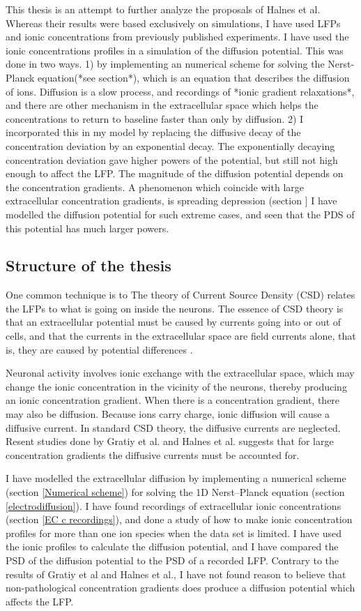 \documentclass{article}
\begin{document}
This thesis is an attempt to further analyze the proposals of Halnes et al. Whereas their results were based exclusively on simulations, I have used LFPs and ionic concentrations from previously published experiments. I have used the ionic concentrations profiles in a simulation of the diffusion potential. This was done in two ways. 1) by implementing an numerical scheme for solving the Nerst-Planck equation(*see section*), which is an equation that describes the diffusion of ions. Diffusion is a slow process, and recordings of *ionic gradient relaxations*, and there are other mechanism in the extracellular space which helps the concentrations to return to baseline faster than only by diffusion. 2)  I incorporated this in my model by replacing the diffusive decay of the concentration deviation by an exponential decay. The exponentially decaying concentration deviation gave higher powers of the potential, but still not high enough to affect the LFP. The magnitude of the diffusion potential depends on the concentration gradients. A phenomenon which coincide with large extracellular concentration gradients, is spreading depression (section ] I have modelled the diffusion potential for such extreme cases, and seen that the PDS of this potential has much larger powers. 
 
\subsection{Structure of the thesis}
  One common technique is to 
The theory of Current Source Density (CSD) relates the LFPs to what is going on inside the neurons. The essence of CSD theory is that an extracellular potential must be caused by currents going into or out of cells, and that the currents in the extracellular space are field currents alone, that is, they are caused by potential differences \cite{Gratiy2017}. 

Neuronal activity involves ionic exchange with the extracellular space, which may change the ionic concentration in the vicinity of the neurons, thereby producing an ionic concentration gradient. When there is a concentration gradient, there may also be diffusion. Because ions carry charge, ionic diffusion will cause a diffusive current. In standard CSD theory, the diffusive currents are neglected. Resent studies done by Gratiy et al. and Halnes et al. suggests that for large concentration gradients the diffusive currents must be accounted for. 



 I have modelled the extracellular diffusion by implementing a numerical scheme (section \ref{Numerical scheme}) for solving the 1D  Nerst--Planck equation (section  \ref{electrodiffusion}). I have found recordings of extracellular ionic concentrations (section \ref{EC c recordings}), and done a study of how to make ionic concentration profiles for more than one ion species when the data set is limited. I have used the ionic profiles to calculate the diffusion potential, and I have compared the PSD of the diffusion potential to the PSD of a recorded LFP.  Contrary to the results of Gratiy et al and Halnes et al., I have not found reason to believe that non-pathological concentration gradients does produce a diffusion potential which affects the LFP. 
\end{document}
